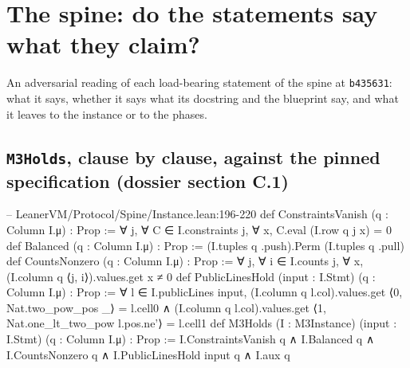 \section{The spine: do the statements say what they claim?}\label{sec:gen-statements-spine}

An adversarial reading of each load-bearing statement of the spine at \texttt{b435631}: what it says, whether it says what its docstring and the blueprint say, and what it leaves to the instance or to the phases.

\par{}\par

\subsection{\texttt{M3Holds}, clause by clause, against the pinned specification (dossier section C.1)}\label{sec:gen-spine-C1}

\begin{leancode}
-- LeanerVM/Protocol/Spine/Instance.lean:196-220
def ConstraintsVanish (q : Column I.μ) : Prop :=
  ∀ j, ∀ C ∈ I.constraints j, ∀ x, C.eval (I.row q j x) = 0
def Balanced (q : Column I.μ) : Prop := (I.tuples q .push).Perm (I.tuples q .pull)
def CountsNonzero (q : Column I.μ) : Prop :=
  ∀ j, ∀ i ∈ I.counts j, ∀ x, (I.column q ⟨j, i⟩).values.get x ≠ 0
def PublicLinesHold (input : I.Stmt) (q : Column I.μ) : Prop :=
  ∀ l ∈ I.publicLines input,
    (I.column q l.col).values.get ⟨0, Nat.two_pow_pos _⟩ = l.cell0 ∧
      (I.column q l.col).values.get ⟨1, Nat.one_lt_two_pow l.pos.ne'⟩ = l.cell1
def M3Holds (I : M3Instance) (input : I.Stmt) (q : Column I.μ) : Prop :=
  I.ConstraintsVanish q ∧ I.Balanced q ∧ I.CountsNonzero q ∧ I.PublicLinesHold input q ∧ I.aux q
\end{leancode}

